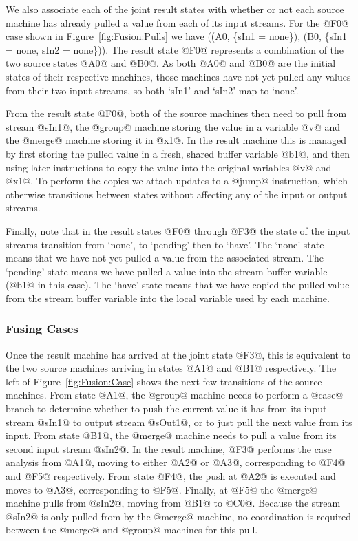 We also associate each of the joint result states with whether or not each source machine has already pulled a value from each of its input streams. For the @F0@ case shown in Figure~\ref{fig:Fusion:Pulls} we have ((A0, \{sIn1 = none\}), (B0, \{sIn1 = none, sIn2 = none\})). The result state @F0@ represents a combination of the two source states @A0@ and @B0@. As both @A0@ and @B0@ are the initial states of their respective machines, those machines have not yet pulled any values from their two input streams, so both `sIn1' and `sIn2' map to `none'.

From the result state @F0@, both of the source machines then need to pull from stream @sIn1@, the @group@ machine storing the value in a variable @v@ and the @merge@ machine storing it in @x1@. In the result machine this is managed by first storing the pulled value in a fresh, shared buffer variable @b1@, and then using later instructions to copy the value into the original variables @v@ and @x1@. To perform the copies we attach updates to a @jump@ instruction, which otherwise transitions between states without affecting any of the input or output streams.

Finally, note that in the result states @F0@ through @F3@ the state of the input streams transition from `none', to `pending' then to `have'. The `none' state means that we have not yet pulled a value from the associated stream. The `pending' state means we have pulled a value into the stream buffer variable (@b1@ in this case). The `have' state means that we have copied the pulled value from the stream buffer variable into the local variable used by each machine. 





\subsubsection{Fusing Cases}
Once the result machine has arrived at the joint state @F3@, this is equivalent to the two source machines arriving in states @A1@ and @B1@ respectively. The left of Figure~\ref{fig:Fusion:Case} shows the next few transitions of the source machines. From state @A1@, the @group@ machine needs to perform a @case@ branch to determine whether to push the current value it has from its input stream @sIn1@ to output stream @sOut1@, or to just pull the next value from its input. From state @B1@, the @merge@ machine needs to pull a value from its second input stream @sIn2@. In the result machine, @F3@ performs the case analysis from @A1@, moving to either @A2@ or @A3@, corresponding to @F4@ and @F5@ respectively. From state @F4@, the push at @A2@ is executed and moves to @A3@, corresponding to @F5@. Finally, at @F5@ the @merge@ machine pulls from @sIn2@, moving from @B1@ to @C0@. Because the stream @sIn2@ is only pulled from by the @merge@ machine, no coordination is required between the @merge@ and @group@ machines for this pull.


